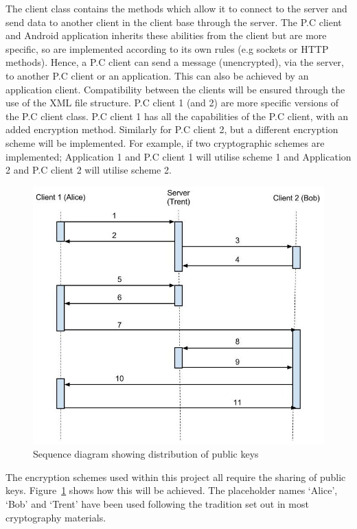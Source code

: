 \documentclass[a4paper,11pt]{article}
\begin{document}
The client class contains the methods which allow it to connect to the server and send data to another client in the client base through the server. The P.C client and Android application inherits these abilities from the client but are more specific, so are implemented according to its own rules (e.g sockets or HTTP methods). Hence, a P.C client can send a message (unencrypted), via the server, to another P.C client or an application. This can also be achieved by an application client. Compatibility between the clients will be ensured through the use of the XML file structure. P.C client 1 (and 2) are more specific versions of the P.C client class. P.C client 1 has all the capabilities of the P.C client, with an added encryption method. Similarly for P.C client 2, but a different encryption scheme will be implemented. For example, if two cryptographic schemes are implemented; Application 1 and P.C client 1 will utilise scheme 1 and Application 2 and P.C client 2 will utilise scheme 2. 

\begin{figure}[htb]
\centering
\includegraphics[scale=0.35]{designs3.jpg}
\caption{Sequence diagram showing distribution of public keys}
\label{fig:designs3}
\end{figure}

The encryption schemes used within this project all require the sharing of public keys. Figure~\ref{fig:designs3} shows how this will be achieved. The placeholder names ‘Alice’, ‘Bob’ and ‘Trent’ have been used following the tradition set out in most cryptography materials.
\end{document}
